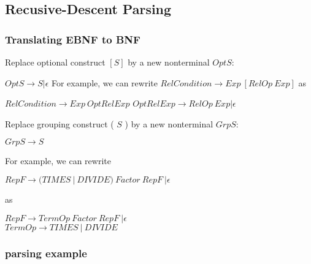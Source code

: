 \subsection{Recusive-Descent Parsing}
\subsubsection{Translating EBNF to BNF}

Replace optional construct $[S]$ by a new nonterminal $OptS$:

$OptS \rightarrow S | \epsilon$ \newline
For example, we can rewrite
$RelCondition \rightarrow Exp \ [RelOp \ Exp]$ \newline
as

$RelCondition \rightarrow Exp \ OptRelExp$
$OptRelExp \rightarrow RelOp \ Exp | \epsilon$

Replace grouping construct ( $S$ ) by a new nonterminal $GrpS$:

$GrpS \rightarrow S$

For example, we can rewrite

$RepF \rightarrow (TIMES \ | \ DIVIDE) \ Factor \ RepF \ | \epsilon$

as 

$RepF \rightarrow TermOp \ Factor \ RepF \ | \epsilon$ \\
$TermOp \rightarrow TIMES \ | \ DIVIDE$

\subsubsection{parsing example}
\vspace*{6.5cm}

\vspace*{0.3cm}
\newblock
